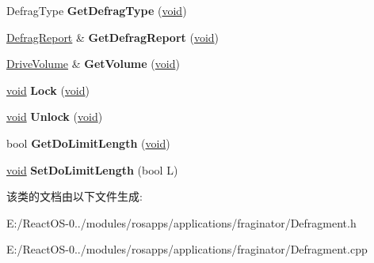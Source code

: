 \begin{DoxyCompactItemize}
\mbox{\label{class_defragment_ac4bd5f5ec52e4adda50a29278b987002}} 
Defrag\+Type {\bfseries Get\+Defrag\+Type} (\hyperlink{interfacevoid}{void})
\item 
\mbox{\label{class_defragment_a1514cda78fa1e846c0ac845cb6c10f66}} 
\hyperlink{struct_defrag_report}{Defrag\+Report} \& {\bfseries Get\+Defrag\+Report} (\hyperlink{interfacevoid}{void})
\item 
\mbox{\label{class_defragment_a1e74eaa9ebdfd4a53f7873d7f35ecfa3}} 
\hyperlink{class_drive_volume}{Drive\+Volume} \& {\bfseries Get\+Volume} (\hyperlink{interfacevoid}{void})
\item 
\mbox{\label{class_defragment_a6d1ad7fdf44c4b606291371cea8eade8}} 
\hyperlink{interfacevoid}{void} {\bfseries Lock} (\hyperlink{interfacevoid}{void})
\item 
\mbox{\label{class_defragment_a1556cba048327d2f97b1c9f3ac891c5d}} 
\hyperlink{interfacevoid}{void} {\bfseries Unlock} (\hyperlink{interfacevoid}{void})
\item 
\mbox{\label{class_defragment_a4393fc8443ab9156187f289bea3ca60d}} 
bool {\bfseries Get\+Do\+Limit\+Length} (\hyperlink{interfacevoid}{void})
\item 
\mbox{\label{class_defragment_abc0cb4ac0b102ad9093f941d84d19cb1}} 
\hyperlink{interfacevoid}{void} {\bfseries Set\+Do\+Limit\+Length} (bool L)
\end{DoxyCompactItemize}


该类的文档由以下文件生成\+:\begin{DoxyCompactItemize}
\item 
E\+:/\+React\+O\+S-\/0../modules/rosapps/applications/fraginator/Defragment.\+h\item 
E\+:/\+React\+O\+S-\/0../modules/rosapps/applications/fraginator/Defragment.\+cpp\end{DoxyCompactItemize}
